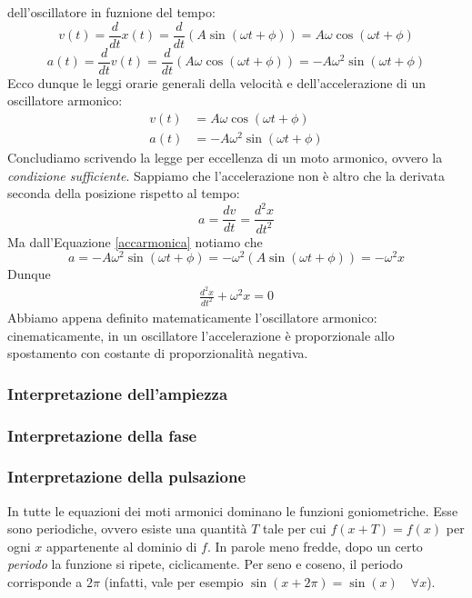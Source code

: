 dell'oscillatore in fuznione del tempo:
\[ v(t) = \frac{d}{dt}x(t) = \frac{d}{dt}(A\sin(\omega t + \phi)) = A\omega\cos(\omega t + \phi) \]
\[ a(t) = \frac{d}{dt}v(t) = \frac{d}{dt}(A\omega\cos(\omega t + \phi)) = -A\omega^2\sin(\omega t + \phi) \]
Ecco dunque le leggi orarie generali della velocità e dell'accelerazione di
un oscillatore armonico:
\begin{align}
    v(t) &= A\omega\cos(\omega t + \phi)\label{velarmonica}\\
    a(t) &= -A\omega^2\sin(\omega t + \phi)\label{accarmonica}
\end{align}
Concludiamo scrivendo la legge per eccellenza di un moto armonico, ovvero la
\textit{condizione sufficiente}. Sappiamo che l'accelerazione non è altro che
la derivata seconda della posizione rispetto al tempo:
\[ a = \frac{dv}{dt} = \frac{d^2x}{dt^2} \]
Ma dall'Equazione \ref{accarmonica} notiamo che
\[ a = -A\omega^2\sin(\omega t + \phi) = -\omega^2(A\sin(\omega t + \phi)) = -\omega^2x \]
Dunque
\begin{align}
    \frac{d^2x}{dt^2} + \omega^2x = 0
\end{align}
Abbiamo appena definito matematicamente l'oscillatore armonico: cinematicamente,
in un oscillatore l'accelerazione è proporzionale allo spostamento con costante
di proporzionalità negativa.

\subsubsection*{Interpretazione dell'ampiezza}
\subsubsection*{Interpretazione della fase}
\subsubsection{Interpretazione della pulsazione}
In tutte le equazioni dei moti armonici dominano le funzioni goniometriche.
Esse sono periodiche, ovvero esiste una quantità $T$ tale per cui $f(x + T) =
f(x)$ per ogni $x$ appartenente al dominio di $f$. In parole meno fredde,
dopo un certo \textit{periodo} la funzione si ripete, ciclicamente. Per seno
e coseno, il periodo corrisponde a $2\pi$ (infatti, vale per esempio $\sin(x+2\pi) =
\sin(x) \quad \forall x$).

